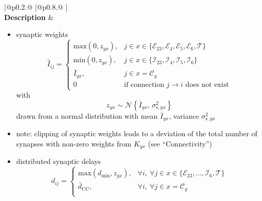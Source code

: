 \documentclass[10pt,a4paper,twoside,american]{article}
\theoremstyle{definitionstyle}
\begin{document}
\clearpage
\begin{table}[H]
\begin{tabular}{
  |@{\hspace*{\marg}}p{}@{\hspace*{\marg}}
  |@{\hspace*{\marg}}p{}@{\hspace*{\marg}}
  |}
  \hline 
  \\
  \hline 
  \textbf{Description} &
  \begin{itemize}
  \item synaptic weights
  \begin{equation}
	  \hat{I}_{ij} = \begin{cases} 
      \text{max}(0,z_{yx}), & j \in x\in\{\mathcal{E}_{23},\mathcal{E}_{4},\mathcal{E}_{5},\mathcal{E}_{6},\mathcal{T}\} \\
      \text{min}(0,z_{yx}), & j \in x\in\{\mathcal{I}_{23},\mathcal{I}_{4},\mathcal{I}_{5},\mathcal{I}_{6}\} \\
      \bar{I}_{yx}, & j \in x=\mathcal{C}_y \\
      0             & \text{if connection $j\to{}i$ does not exist}
      \end{cases}
  \end{equation}
  with
  \begin{equation}
      z_{yx} \sim\mathcal{N}\left\{\bar{I}_{yx},\,\sigma_{\text{s},yx}^2\right\}
  \end{equation}
  drawn from a normal distribution with mean $\bar{I}_{yx}$, variance $\sigma_{\text{s},yx}^2$
  \item[] note: clipping of synaptic weights leads to a deviation of the total number of synapses with non-zero weights from $K_{yx}$ (see ``Connectivity'')
  \item distributed synaptic delays
  \begin{equation}
      d_{ij} = \begin{cases} 
	      \text{max}(d_\text{min},z_{yx}), & \forall i,\ \forall j \in x\in\{\mathcal{E}_{23},\ldots,\mathcal{I}_{6},\mathcal{T}\} \\
                 \bar{d}_\text{CC}, & \forall i,\ \forall j \in x=\mathcal{C}_y \\                 

\end{cases}
\end{equation}
\end{itemize}
\end{tabular}
\end{table}
\end{document}
